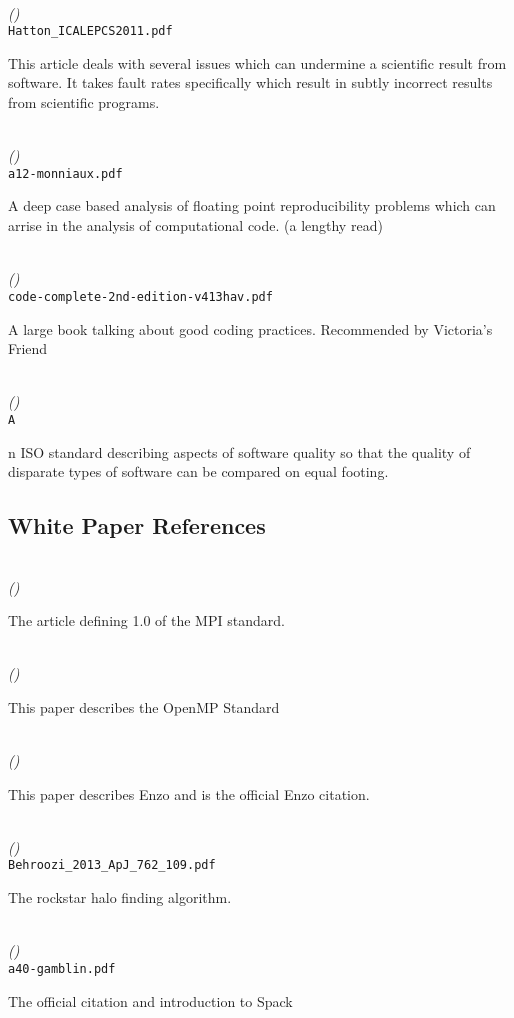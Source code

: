 \documentclass{article}
\newenvironment{refdef}[2] {
	\noindent \textbf{\citetitle{#1}} \cite{#1}\\ \citejournalorbooktitle{#1} \textit{(\citeyear{#1})}\\ \texttt{#2} \vspace{0.2in} \par 
} {
\vspace{0.2in}
}
\begin{document}
\begin{refdef}{hattoicalepcs2011}{Hatton\_ICALEPCS2011.pdf}
This article deals with several issues which can undermine a scientific result from software. It takes fault rates specifically which result in subtly incorrect results from scientific programs.
\end{refdef}

\begin{refdef}{Monniaux:2008:PVF:1353445.1353446}{a12-monniaux.pdf}
A deep case based analysis of floating point reproducibility problems which can arrise in the analysis of computational code. (a lengthy read)
\end{refdef}

\begin{refdef}{code-complete}{code-complete-2nd-edition-v413hav.pdf}
A large book talking about good coding practices. Recommended by Victoria's Friend
\end{refdef}

\begin{refdef}{ISO-9126}
An ISO standard describing aspects of software quality so that the quality of disparate types of software can be compared on equal footing.
\end{refdef}

\subsection{White Paper References}

\begin{refdef}{MPI-Standard}{}
The article defining 1.0 of the MPI standard.
\end{refdef}

\begin{refdef}{OpenMP-Standard}{}
This paper describes the OpenMP Standard
\end{refdef}

\begin{refdef}{Enzo}{}
This paper describes Enzo and is the official Enzo citation.
\end{refdef}

\begin{refdef}{rockstar}{Behroozi\_2013\_ApJ\_762\_109.pdf}
The rockstar halo finding algorithm.
\end{refdef}

\begin{refdef}{Spack}{a40-gamblin.pdf}
The official citation and introduction to Spack
\end{refdef}
\end{document}
